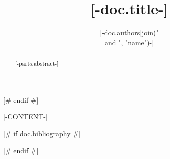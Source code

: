 \documentclass{article}
\title{[-doc.title-]}
\author{[-doc.authors|join(" \\and ", "name")-]}
\date{\displaydate{articleDate}}
\theoremstyle{plain}
\theoremstyle{definition}
\theoremstyle{plain}
\begin{document}
\begin{abstract}[-parts.abstract-]\end{abstract}[# endif #]

[-CONTENT-]


[# if doc.bibliography #]

[# endif #]
\end{document}
